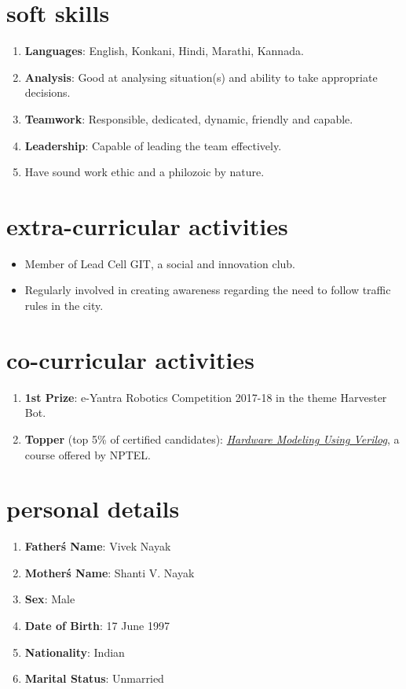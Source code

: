 \documentclass[10pt]{article}
\begin{document}
\section*{soft skills}
\begin{enumerate}
\item \textbf{Languages}: English, Konkani, Hindi, Marathi, Kannada.
\item \textbf{Analysis}: Good at analysing situation(s) and ability to take appropriate decisions.
\item\textbf{Teamwork}: Responsible, dedicated, dynamic, friendly and capable.
\item\textbf{Leadership}: Capable of leading the team effectively. 
\item Have sound work ethic and a philozoic by nature.
\end{enumerate}
\section*{extra-curricular activities}
\begin{itemize}
\item Member of Lead Cell GIT, a social and innovation club.
\item Regularly involved in creating awareness regarding the need to follow traffic rules in the city.
\end{itemize}

\section*{co-curricular activities}
\begin{enumerate}
\item \textbf{1st Prize}: e-Yantra Robotics Competition 2017-18 in the theme Harvester Bot.
\item \textbf{Topper} (top 5\% of certified candidates): \href{http://nptel.ac.in/noc/E_Certificate/noc17-cs21/NPTEL17CS21S1150001171010224.jpg}{\textit{Hardware Modeling Using Verilog}}, a course offered by NPTEL.
\end{enumerate}

\section*{personal details}
\begin{enumerate}
\item \textbf{Father\'s Name}: Vivek Nayak
\item \textbf{Mother\'s Name}: Shanti V. Nayak
\item \textbf{Sex}: Male
\item \textbf{Date of Birth}: 17 June 1997
\item \textbf{Nationality}: Indian
\item \textbf{Marital Status}: Unmarried
\end{enumerate}
\end{document}
